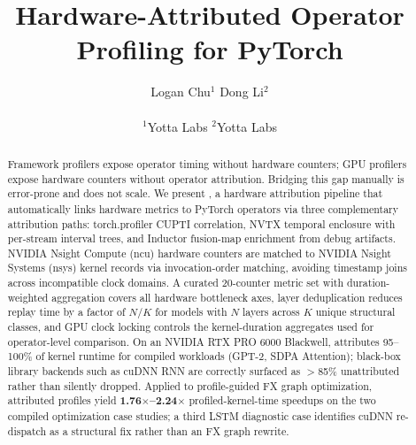 ﻿\documentclass{article}
\title{Hardware-Attributed Operator Profiling for PyTorch}
\author{
Logan Chu$^{1}$ \quad
Dong Li$^{2}$ \\
\\
$^{1}$Yotta Labs \quad
$^{2}$Yotta Labs
}
\date{}
\begin{document}
\maketitle

\begin{abstract}
Framework profilers expose operator timing without hardware counters; GPU profilers expose
hardware counters without operator attribution. Bridging this gap manually is error-prone and
does not scale. We present \textbf{\sys}, a hardware attribution pipeline that automatically
links hardware metrics to PyTorch operators via three
complementary attribution paths: torch.profiler CUPTI correlation,
NVTX temporal enclosure with per-stream interval trees, and Inductor fusion-map
enrichment from debug artifacts. NVIDIA Nsight Compute (ncu) hardware counters are matched to NVIDIA Nsight Systems (nsys) kernel records
via invocation-order matching, avoiding timestamp joins across incompatible clock domains. A curated 20-counter metric set with
duration-weighted aggregation covers all hardware bottleneck axes, layer deduplication reduces \ncu replay time by a factor of $N/K$ for models with $N$ layers across $K$ unique structural classes, and
GPU clock locking controls the kernel-duration aggregates used for operator-level comparison.
On an NVIDIA RTX PRO 6000 Blackwell, \sys attributes 95--100\% of kernel
runtime for compiled workloads (GPT-2, SDPA Attention); black-box library backends
such as cuDNN RNN are correctly surfaced as ${>}$85\% unattributed rather than silently dropped.
Applied to profile-guided FX graph optimization, attributed profiles yield
\textbf{1.76$\times$--2.24$\times$} profiled-kernel-time speedups on the two
compiled optimization case studies; a third LSTM diagnostic case identifies
cuDNN re-dispatch as a structural fix rather than an FX graph rewrite.
\end{abstract}






\newpage


\newpage
\appendix
\onecolumn

\end{document}
